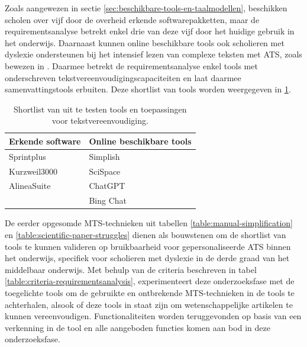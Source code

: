 \medspace

Zoals aangewezen in sectie \ref{sec:beschikbare-tools-en-taalmodellen}, beschikken scholen over vijf door de overheid erkende softwarepakketten, maar de requirementsanalyse betrekt enkel drie van deze vijf door het huidige gebruik in het onderwijs. Daarnaast kunnen online beschikbare tools ook scholieren met dyslexie ondersteunen bij het intensief lezen van complexe teksten met ATS, zoals bewezen in \textcite{Bingel2018}. Daarmee betrekt de requirementsanalyse enkel tools met onderschreven tekstvereenvoudigingscapaciteiten en laat daarmee samenvattingstools erbuiten. Deze shortlist van tools worden weergegeven in \ref{table:shortlist-tools}.

\begin{center}
	\begin{table}[H]
		\begin{tabular}{ | m{6cm} | m{6cm} | } 
			\hline
			\textbf{Erkende software} & \textbf{Online beschikbare tools} \\
			\hline
			Sprintplus & Simplish \\
			Kurzweil3000 & SciSpace \\ 
			AlineaSuite & ChatGPT \\
			& Bing Chat\\
			\hline
		\end{tabular}
		\caption{Shortlist van uit te testen tools en toepassingen voor tekstvereenvoudiging.}
		\label{table:shortlist-tools}	
	\end{table}
\end{center}

De eerder opgesomde MTS-technieken uit tabellen \ref{table:manual-simplification} en \ref{table:scientific-paper-struggles} dienen als bouwstenen om de shortlist van tools te kunnen valideren op bruikbaarheid voor gepersonaliseerde ATS binnen het onderwijs, specifiek voor scholieren met dyslexie in de derde graad van het middelbaar onderwijs. Met behulp van de criteria beschreven in tabel \ref{table:criteria-requirementsanalysis}, experimenteert deze onderzoeksfase met de toegelichte tools om de gebruikte en ontbrekende MTS-technieken in de tools te achterhalen, alsook of deze tools in staat zijn om wetenschappelijke artikelen te kunnen vereenvoudigen. Functionaliteiten worden teruggevonden op basis van een verkenning in de tool en alle aangeboden functies komen aan bod in deze onderzoeksfase. 

